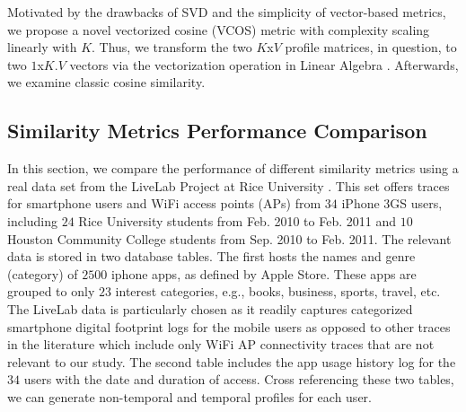 \documentclass[conference]{IEEEtran}
\theoremstyle{definition}
\begin{document}
Motivated by the drawbacks of SVD and the simplicity of vector-based metrics, we 
propose a novel vectorized cosine (VCOS) metric with complexity scaling linearly with 
$K$. Thus, we transform the two $K$x$V$ profile matrices, in question, to two $1$x$K.V$ 
vectors via the vectorization operation in Linear Algebra \cite{svd}. Afterwards, we examine classic cosine similarity. 
%
\vspace{-0.3 cm}
\subsection{Similarity Metrics Performance Comparison}
\vspace{-0.2 cm}
%
In this section, we compare the performance of different similarity
metrics using a real data set from the LiveLab Project at Rice University
\cite{data}. This set offers traces for smartphone users and 
WiFi access points (APs) from $34$ iPhone 3GS users, including $24$ Rice
University students from Feb. 2010 to Feb. 2011 and $10$ Houston
Community College students from Sep. 2010 to Feb. 2011. The relevant data is
stored in two database tables. The first hosts the names and genre
(category) of $2500$ iphone apps, as defined by Apple Store. These
apps are grouped to only $23$ interest categories, e.g., books, business,
sports, travel, etc. The LiveLab data is particularly chosen as it
readily captures categorized smartphone digital footprint logs for
the mobile users as opposed to other traces in the literature which
include only WiFi AP connectivity traces that are not relevant to
our study. The second table includes the app usage history log for
the $34$ users with the date and duration of access. Cross referencing
these two tables, we can generate non-temporal and temporal profiles
for each user.
\end{document}
